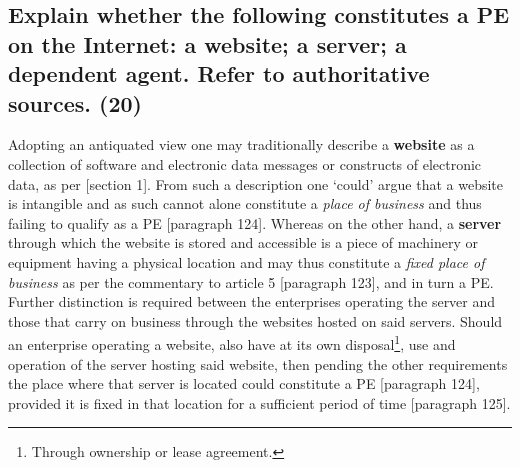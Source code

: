 \documentclass[11pt]{article}
\begin{document}
\subsection{Explain whether the following constitutes a PE on the Internet: a website; a server; a dependent agent. Refer to authoritative sources. (20)}
\label{sec:orge56392f}

Adopting an antiquated view one may traditionally describe a \textbf{website} as a
collection of software and electronic data messages or constructs of electronic
data, as per [section 1]\cite{rsa02_elect_comm_trans_act}. From such a description
one `could' argue that a website is intangible and as such cannot alone
constitute a \emph{place of business} and thus failing to qualify as a PE
[paragraph 124]\cite{oecd17_model_tax}. Whereas on
the other hand, a \textbf{server} through which the website is stored and accessible is
a piece of machinery or equipment having a physical location and may thus
constitute a \emph{fixed place of business} as per the commentary to article 5
[paragraph 123]\cite{oecd17_model_tax}, and in turn a PE.\\

Further distinction is required between the enterprises operating the server and
those that carry on business through the websites hosted on said servers.
Should an enterprise operating a website, also have at its own
disposal\footnote{Through ownership or lease agreement.}, use and operation of the
server hosting said website, then pending the other requirements the place where
that server is located could constitute a PE [paragraph
124]\cite{oecd17_model_tax}, provided it is fixed in that location for a
sufficient period of time [paragraph 125]\cite{oecd17_model_tax}.\\
\end{document}
